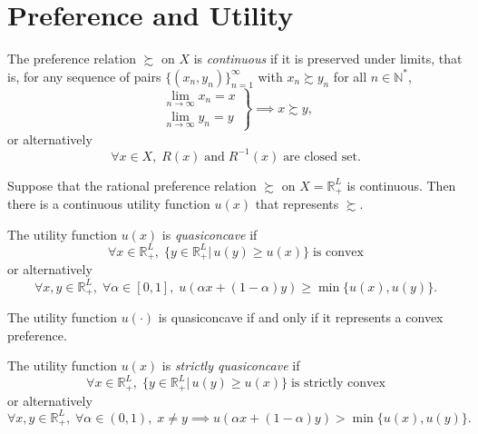 \documentclass[12pt,fleqn]{book} %
\begin{document}
\section{Preference and Utility}

\begin{definition}[Continuity]
    The preference relation $\succsim$ on $X$ is \emph{continuous} if it is preserved under limits, that is, for any sequence of pairs $\{(x_n, y_n)\}_{n=1}^\infty$ with $x_n\succsim y_n$ for all $n\in\mathbb{N^*}$,
    \begin{equation*}
    \left.
    \begin{aligned}
    	\lim_{n\to\infty} x_n=x\\
    	\lim_{n\to\infty} y_n=y
    \end{aligned}
    \right\}
    \implies x\succsim y,
    \end{equation*}
    or alternatively
    \[
    \forall x\in X,\; R(x)\;\text{and}\;R^{-1}(x)\;\text{are closed set}.
    \]
    
\end{definition}

\begin{theorem}
	Suppose that the rational preference relation $\succsim$ on $X=\mathbb{R}_+^L$ is continuous.
	Then there is a continuous utility function $u(x)$ that represents $\succsim$.
\end{theorem}

\begin{definition}[Quasiconcavity]
	The utility function $u(x)$ is \emph{quasiconcave} if
	\[
	\forall x\in\mathbb{R}_+^L,\;\{y\in\mathbb{R}_+^L|\,u(y)\geqslant u(x)\}\;\text{is convex}
	\]
	or alternatively
	\[
	\forall x,y\in\mathbb{R}_+^L,\;\forall \alpha\in[0,1],\;u(\alpha x+(1-\alpha)y)\geqslant \min\{u(x),u(y)\}.
	\]
\end{definition}

\begin{proposition}
	The utility function $u(\cdot)$ is quasiconcave if and only if it represents a convex preference.
\end{proposition}


\begin{definition}
	The utility function $u(x)$ is \emph{strictly quasiconcave} if
	\[
	\forall x\in\mathbb{R}_+^L,\;\{y\in\mathbb{R}_+^L|\,u(y)\geqslant u(x)\}\;\text{is strictly convex}
	\]
	or alternatively
	\[
	\forall x,y\in\mathbb{R}_+^L,\;\forall \alpha\in(0,1),\;x\ne y\implies u(\alpha x+(1-\alpha)y)>\min\{u(x),u(y)\}.
	\]
\end{definition}
\end{document}
